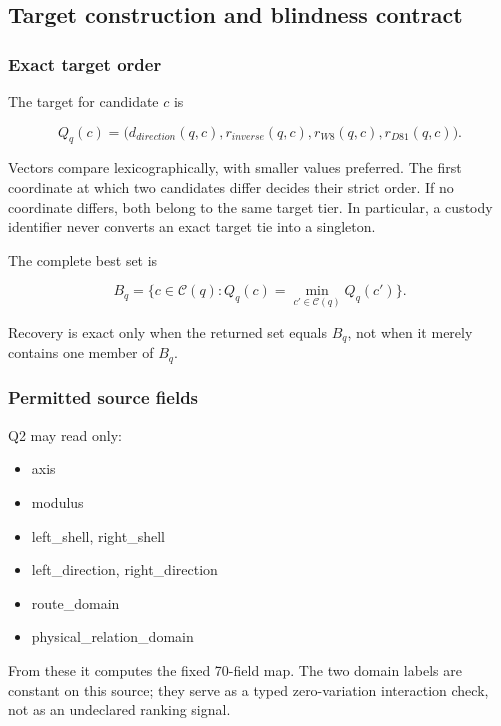\subsection{Target construction and blindness
contract}\label{viii-ch07-target-construction-and-blindness-contract}

\subsubsection{Exact target order}\label{viii-ch07-exact-target-order}

The target for candidate \(c\) is

\[
Q_q(c)=
\bigl(
d_{direction}(q,c),
r_{inverse}(q,c),
r_{W8}(q,c),
r_{D81}(q,c)
\bigr).
\]

Vectors compare lexicographically, with smaller values preferred. The
first coordinate at which two candidates differ decides their strict
order. If no coordinate differs, both belong to the same target tier. In
particular, a custody identifier never converts an exact target tie into
a singleton.

The complete best set is

\[
B_q=\{c\in\mathcal C(q):Q_q(c)=\min_{c'\in\mathcal C(q)}Q_q(c')\}.
\]

Recovery is exact only when the returned set equals \(B_q\), not when it
merely contains one member of \(B_q\).

\subsubsection{Permitted source fields}\label{viii-ch07-permitted-source-fields}

Q2 may read only:

\begin{itemize}
\tightlist
\item
  axis
\item
  modulus
\item
  left\_shell, right\_shell
\item
  left\_direction, right\_direction
\item
  route\_domain
\item
  physical\_relation\_domain
\end{itemize}

From these it computes the fixed 70-field map. The two domain labels are
constant on this source; they serve as a typed zero-variation
interaction check, not as an undeclared ranking signal.

